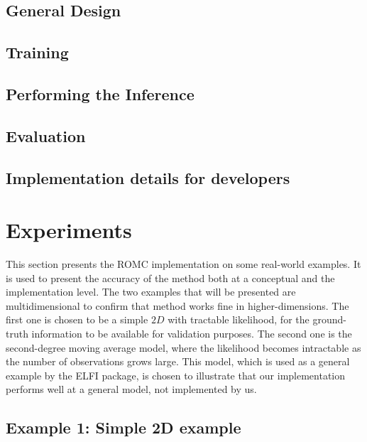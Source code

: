 \documentclass[11pt,twoside]{article}
\numberwithin{Theorem}{section}
\numberwithin{Definition}{section}
\numberwithin{Lemma}{section}
\numberwithin{Algorithm}{section}
\numberwithin{equation}{section}
\begin{document}
\subsection{General Design}
\label{subsec:general_design}
% 


\subsection{Training}
\label{subsec:training}


\subsection{Performing the Inference}
\label{subsec:inference}


\subsection{Evaluation}
\label{subsec:evaluation}


\subsection{Implementation details for developers}
\label{subsec:developers}



\clearpage
\section{Experiments}
This section presents the ROMC implementation on some real-world
examples. It is used to present the accuracy of the method both at a
conceptual and the implementation level. The two examples that will be
presented are multidimensional to confirm that method works fine in
higher-dimensions. The first one is chosen to be a simple $2D$ with
tractable likelihood, for the ground-truth information to be available
for validation purposes. The second one is the second-degree moving
average model, where the likelihood becomes intractable as the number
of observations grows large. This model, which is used as a general
example by the ELFI package, is chosen to illustrate that our
implementation performs well at a general model, not implemented by
us.

\subsection{Example 1: Simple 2D example}
\label{subsec:ex1}

\end{document}
